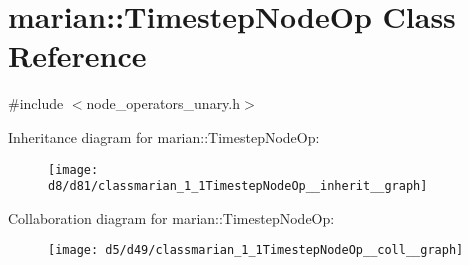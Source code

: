 \hypertarget{classmarian_1_1TimestepNodeOp}{}\section{marian\+:\+:Timestep\+Node\+Op Class Reference}
\label{classmarian_1_1TimestepNodeOp}


{\ttfamily \#include $<$node\+\_\+operators\+\_\+unary.\+h$>$}



Inheritance diagram for marian\+:\+:Timestep\+Node\+Op\+:
\nopagebreak
\begin{figure}[H]
\begin{center}
\leavevmode
\texttt{[image: d8/d81/classmarian\_1\_1TimestepNodeOp\_\_inherit\_\_graph]}
\end{center}
\end{figure}


Collaboration diagram for marian\+:\+:Timestep\+Node\+Op\+:
\nopagebreak
\begin{figure}[H]
\begin{center}
\leavevmode
\texttt{[image: d5/d49/classmarian\_1\_1TimestepNodeOp\_\_coll\_\_graph]}
\end{center}
\end{figure}
